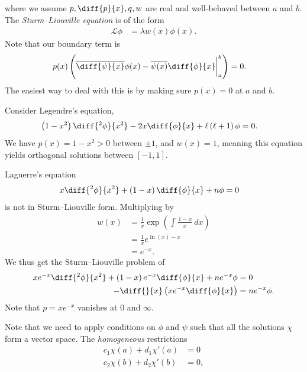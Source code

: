 \documentclass[10pt]{mypackage}
\begin{document}
  where we assume $p,\diff{p}{x},q,w$ are real and well-behaved between $a$ and $b$. The \textit{Sturm--Liouville equation} is of the form
  \begin{align*}
    \mathcal{L}\phi &= \lambda w(x)\phi(x).
  \end{align*}
  Note that our boundary term is
  \begin{align*}
    p(x) \left( \overline{\diff{\psi}{x}}\phi(x) - \overline{\psi(x)}\diff{\phi}{x}\biggr\vert_{a}^{b} \right) &= 0.
  \end{align*}
  The easiest way to deal with this is by making sure $p(x) = 0$ at $a$ and $b$.
  \begin{example}
    Consider Legendre's equation,
    \begin{align*}
      \left( 1-x^2 \right)\diff{^2\phi}{x^2} - 2x\diff{\phi}{x} + \ell\left( \ell + 1 \right)\phi &= 0.
    \end{align*}
    We have $p(x) = 1-x^2 > 0$ between $\pm 1$, and $w(x) = 1$, meaning this equation yields orthogonal solutions between $[-1,1]$.\newline

    Laguerre's equation
    \begin{align*}
      x\diff{^2\phi}{x^2} + \left( 1-x \right)\diff{\phi}{x} + n\phi &= 0
    \end{align*}
    is not in Sturm--Liouville form. Multiplying by
    \begin{align*}
      w(x) &= \frac{1}{x}\exp\left( \int_{}^{} \frac{1-x}{x}\:dx \right)\\
           &= \frac{1}{x}e^{\ln(x) - x}\\
           &= e^{-x}.
    \end{align*}
    We thus get the Sturm--Liouville problem of
    \begin{align*}
      xe^{-x}\diff{^2\phi}{x^2} + \left( 1-x \right)e^{-x}\diff{\phi}{x} + ne^{-x}\phi &= 0\\
      -\diff{}{x}\left( xe^{-x}\diff{\phi}{x} \right) &= ne^{-x}\phi.
    \end{align*}
    Note that $p = xe^{-x}$ vanishes at $0$ and $\infty$.
  \end{example}
  Note that we need to apply conditions on $\phi$ and $\psi$ such that all the solutions $\chi$ form a vector space. The \textit{homogeneous} restrictions
  \begin{align*}
    c_1\chi(a) + d_1\chi'(a) &= 0\\
    c_2\chi(b) + d_2\chi'(b) &= 0,
  \end{align*}
\end{document}
